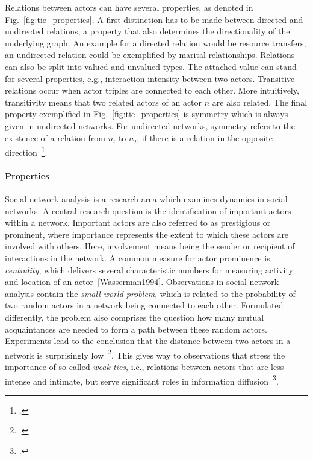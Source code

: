 Relations between actors can have several properties, as denoted in Fig.~\ref{fig:tie_properties}.
A first distinction has to be made between directed and undirected relations,
a property that also determines the directionality of the underlying graph.
An example for a directed relation would be resource transfers, an undirected
relation could be exemplified by marital relationships.
Relations can also be split into valued and unvalued types.
The attached value can stand for several properties, e.g., interaction intensity
between two actors.
Transitive relations occur when actor triples are connected to each other.
More intuitively, transitivity means that two related actors of an actor $n$ are
also related.
The final property exemplified in Fig.~\ref{fig:tie_properties} is symmetry which
is always given in undirected networks.
For undirected networks, symmetry refers to the existence of a relation from
$n_i$ to $n_j$, if there is a relation in the opposite direction~\footcite{Wasserman1994}.

\paragraph{Properties}

Social network analysis is a research area which examines dynamics in social
networks.
A central research question is the identification of important actors within
a network.
Important actors are also referred to as prestigious or prominent, where importance
represents the extent to which these actors are involved with others.
Here, involvement means being the sender or recipient of interactions in the
network.
A common measure for actor prominence is \textit{centrality}, which delivers
several characteristic numbers for measuring activity and location of an actor~\ref{Wasserman1994}.
Observations in social network analysis contain the \textit{small world problem},
which is related to the probability of two random actors in a network being
connected to each other.
Formulated differently, the problem also comprises the question how many
mutual acquaintances are needed to form a path between these random actors.
Experiments lead to the conclusion that the distance between two actors in
a network is surprisingly low~\footcite{Travers1969}.
This gives way to observations that stress the importance of so-called
\textit{weak ties}, i.e., relations between actors that are less intense and
intimate, but serve significant roles in information diffusion~\footcite{Granovetter1973}.

